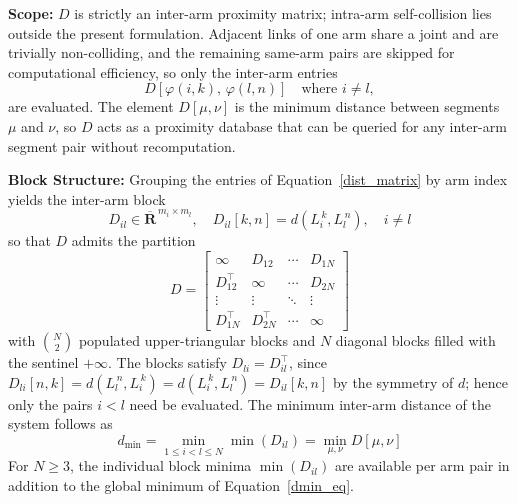 \noindent\textbf{Scope:} $D$ is strictly an inter-arm proximity matrix; intra-arm self-collision lies outside the present formulation. Adjacent links of one arm share a joint and are trivially non-colliding, and the remaining same-arm pairs are skipped for computational efficiency, so only the inter-arm entries
\begin{equation}
D\left[ \varphi(i,k),\, \varphi(l,n) \right] \quad \text{where } i \neq l,
\label{eq:dm_intermatrix}
\end{equation}
are evaluated. The element $D[\mu,\nu]$ is the minimum distance between segments $\mu$ and $\nu$, so $D$ acts as a proximity database that can be queried for any inter-arm segment pair without recomputation.

\noindent\textbf{Block Structure:} Grouping the entries of Equation~\eqref{dist_matrix} by arm index yields the inter-arm block
\begin{equation}
D_{il} \in \overline{\mathbf{R}}^{\,m_i \times m_l}, \quad D_{il}[k,n] = d(L_i^{\,k}, L_l^{\,n}), \quad i \neq l
\label{block_eq}
\end{equation}
so that $D$ admits the partition
\begin{equation}
D =
\begin{bmatrix}
\boldsymbol{\infty} & D_{12} & \cdots & D_{1N}\\
D_{12}^{\top} & \boldsymbol{\infty} & \cdots & D_{2N}\\
\vdots & \vdots & \ddots & \vdots\\
D_{1N}^{\top} & D_{2N}^{\top} & \cdots & \boldsymbol{\infty}
\end{bmatrix}
\label{block_partition}
\end{equation}
with $\binom{N}{2}$ populated upper-triangular blocks and $N$ diagonal blocks filled with the sentinel $+\infty$. The blocks satisfy $D_{li} = D_{il}^{\top}$, since $D_{li}[n, k] = d(L_l^{\,n},L_i^{\,k}) = d(L_i^{\,k},L_l^{\,n}) = D_{il}[k,n]$ by the symmetry of $d$; hence only the pairs $i < l$ need be evaluated. The minimum inter-arm distance of the system follows as
\begin{equation}
d_{\min} = \min_{1 \leq i < l \leq N} \min\left( D_{il} \right) = \min_{\mu,\nu} D[\mu,\nu]
\label{dmin_eq}
\end{equation}
For $N \geq 3$, the individual block minima $\min(D_{il})$ are available per arm pair in addition to the global minimum of Equation~\eqref{dmin_eq}.

